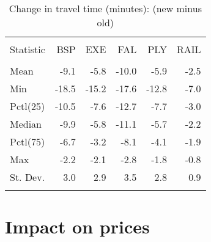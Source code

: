 \documentclass{article}\usepackage[]{graphicx}\usepackage[]{color}
\begin{document}
\begin{table}[!htbp] \centering 
  \caption{Change in travel time (minutes): (new minus old)} 
  \label{} 
\small 
\begin{tabular}{@{\extracolsep{2pt}}lD{.}{.}{-1} D{.}{.}{-1} D{.}{.}{-1} D{.}{.}{-1} D{.}{.}{-1} } 
\\[-1.8ex]\hline 
\hline \\[-1.8ex] 
Statistic & BSP & EXE & FAL & PLY & RAIL \\ 
\hline \\[-1.8ex] 
Mean & -9.1 & -5.8 & -10.0 & -5.9 & -2.5 \\ 
Min & -18.5 & -15.2 & -17.6 & -12.8 & -7.0 \\ 
Pctl(25) & -10.5 & -7.6 & -12.7 & -7.7 & -3.0 \\ 
Median & -9.9 & -5.8 & -11.1 & -5.7 & -2.2 \\ 
Pctl(75) & -6.7 & -3.2 & -8.1 & -4.1 & -1.9 \\ 
Max & -2.2 & -2.1 & -2.8 & -1.8 & -0.8 \\ 
St. Dev. & 3.0 & 2.9 & 3.5 & 2.8 & 0.9 \\ 
\hline \\[-1.8ex] 
\end{tabular} 
\end{table} 

\pagebreak
\section{Impact on prices}
\end{document}
